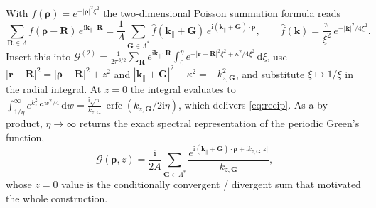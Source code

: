 \documentclass[11pt,a4paper]{article}
\DeclareMathOperator{\erfc}{erfc}
\newcommand{\rd}{\mathrm{d}}
\newcommand{\ii}{\mathrm{i}}
\newcommand{\kpar}{\mathbf{k}_{\parallel}}
\newcommand{\vr}{\mathbf{r}}
\newcommand{\vR}{\mathbf{R}}
\newcommand{\vG}{\mathbf{G}}
\newcommand{\brho}{\boldsymbol{\rho}}
\newcommand{\Lat}{\Lambda}
\newcommand{\dLat}{\Lambda^{\ast}}
\newcommand{\kzG}{k_{z,\vG}}
\begin{document}
With $f(\brho)=e^{-|\brho|^{2}\xi^{2}}$ the two-dimensional Poisson summation formula reads
\begin{equation}
\sum_{\vR\in\Lat}f(\brho-\vR)\,e^{\ii\kpar\cdot\vR}
=\frac{1}{A}\sum_{\vG\in\dLat}\widehat{f}(\kpar+\vG)\,e^{\ii(\kpar+\vG)\cdot\brho},
\qquad
\widehat{f}(\mathbf{k})=\frac{\pi}{\xi^{2}}\,e^{-|\mathbf{k}|^{2}/4\xi^{2}}.
\end{equation}
Insert this into $\mathcal{G}^{(2)}=\tfrac{1}{2\pi^{3/2}}\sum_{\vR}e^{\ii\kpar\cdot\vR}
\int_0^\eta e^{-|\vr-\vR|^{2}\xi^{2}+\kappa^{2}/4\xi^{2}}\,\rd\xi$, use
$|\vr-\vR|^{2}=|\brho-\vR|^{2}+z^{2}$ and
$|\kpar+\vG|^{2}-\kappa^{2}=-\kzG^{2}$, and substitute $\xi\mapsto 1/\xi$ in the radial
integral. At $z=0$ the integral evaluates to
$\int_{1/\eta}^{\infty}e^{\kzG^{2}w^{2}/4}\,\rd w
=\frac{\ii\sqrt{\pi}}{\kzG}\,\erfc(\kzG/2\ii\eta)$,
which delivers \eqref{eq:recip}. As a by-product, $\eta\to\infty$ returns the exact spectral
representation of the periodic Green's function,
\begin{equation}
\mathcal{G}(\brho,z)
=\frac{\ii}{2A}\sum_{\vG\in\dLat}
\frac{e^{\ii(\kpar+\vG)\cdot\brho+\ii\kzG|z|}}{\kzG},
\end{equation}
whose $z=0$ value is the conditionally convergent / divergent sum that motivated the whole
construction.
\end{document}
